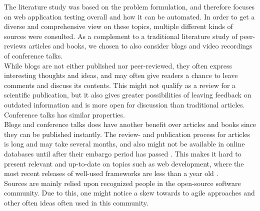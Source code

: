 
The literature study was based on the problem formulation, and therefore
focuses on web application testing overall and how it can be automated.
In order to get a diverse and comprehensive view on these topics,
multiple different kinds of sources were consulted. As a
complement to a traditional literature study of peer-reviews articles
and books, we chosen to also consider blogs and video recordings of
conference talks.\\

While blogs are not either published nor peer-reviewed, they often
express  interesting thoughts and ideas, and may often give readers a
chance to leave comments and discuss its contents. This might not
qualify as a review for a scientific publication, but it also gives
greater possibilities of leaving feedback on outdated information and
is more open for discussion than traditional articles. Conference
talks has similar properties.\\

Blogs and conference talks does have another benefit over articles and
books since they can be published instantly. The review- and publication
process for articles is long and may take several months, and also might
not be available in online databases until after their embargo period
has passed \cite{wiki:embargo,pdf:publishing}. This makes it hard to
present relevant and up-to-date on topics such as web development, where
the most recent releases of well-used frameworks are less than a year
old \cite{wiki:rails-versions,wiki:django-versions,web:knockout-versions}.\\

Sources are mainly relied upon recognized people in the open-source
software community. Due to this, one might notice a skew towards to
agile approaches and other often ideas often used in this community.\\
